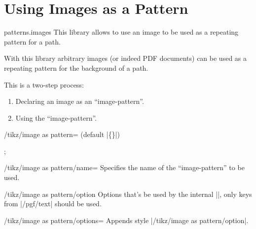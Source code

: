 %
%
%
\clearpage
\section{Using Images as a Pattern}
\label{library:patterns.images}

\begin{tikzlibrary}{patterns.images}
  This library allows to use an image to be used as a repeating pattern for a path.
\end{tikzlibrary}

With this library arbitrary images (or indeed PDF documents) can be used as
a repeating pattern for the background of a path.

This is a two-step process:
\begin{enumerate}
\item Declaring an image as an ``image-pattern''.
\item Using the ``image-pattern''.
\end{enumerate}

\begin{command}{\pgfsetupimageaspattern{}}
\end{command}

\begin{key}{/tikz/image as pattern= (default |\{\}|)}

\begin{codeexample}[preamble=\usetikzlibrary{patterns.images}]
\tikz \node[star, minimum size=3cm, draw,
  image as pattern={name=grid,options={left, bottom, y=-.5cm, rotate=45}}] {};
\end{codeexample}
\end{key}

\begin{key}{/tikz/image as pattern/name=}
Specifies the name of the ``image-pattern'' to be used.
\end{key}

\begin{stylekey}{/tikz/image as pattern/option}
Options that's be used by the internal |\pgftext|,
only keys from |/pgf/text| should be used.
\end{stylekey}

\begin{stylekey}{/tikz/image as pattern/options=}
Appends style |/tikz/image as pattern/option|.
\end{stylekey}